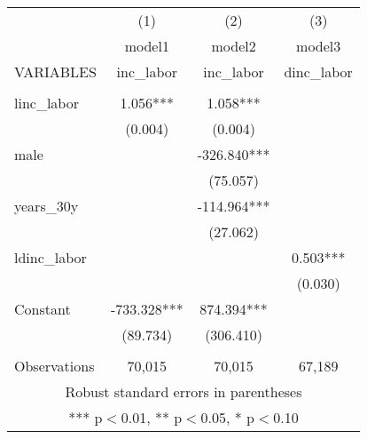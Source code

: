 \begin{tabular}{lccc} \hline
 & (1) & (2) & (3) \\
 & model1 & model2 & model3 \\
VARIABLES & inc\_labor & inc\_labor & dinc\_labor \\ \hline
 &  &  &  \\
linc\_labor & 1.056*** & 1.058*** &  \\
 & (0.004) & (0.004) &  \\
male &  & -326.840*** &  \\
 &  & (75.057) &  \\
years\_30y &  & -114.964*** &  \\
 &  & (27.062) &  \\
ldinc\_labor &  &  & 0.503*** \\
 &  &  & (0.030) \\
Constant & -733.328*** & 874.394*** &  \\
 & (89.734) & (306.410) &  \\
 &  &  &  \\
 Observations & 70,015 & 70,015 & 67,189 \\ \hline
\multicolumn{4}{c}{ Robust standard errors in parentheses} \\
\multicolumn{4}{c}{ *** p$<$0.01, ** p$<$0.05, * p$<$0.10} \\
\end{tabular}
